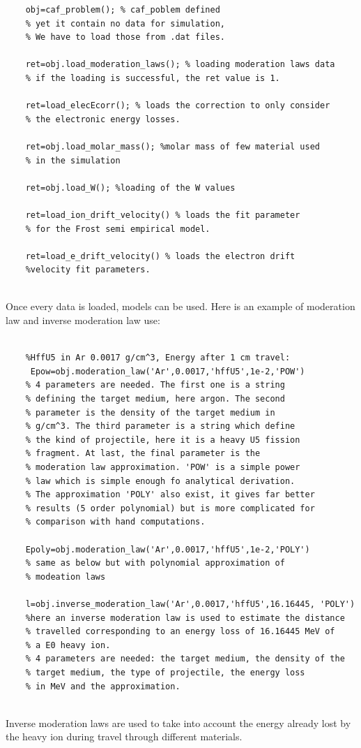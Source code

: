 \documentclass[10pt]{article}
\begin{document}
	\begin{lstlisting}
	obj=caf_problem(); % caf_poblem defined
	% yet it contain no data for simulation,
	% We have to load those from .dat files.
	
	ret=obj.load_moderation_laws(); % loading moderation laws data
	% if the loading is successful, the ret value is 1.
	
	ret=load_elecEcorr(); % loads the correction to only consider
	% the electronic energy losses.
	
	ret=obj.load_molar_mass(); %molar mass of few material used 
	% in the simulation
	
	ret=obj.load_W(); %loading of the W values
	
	ret=load_ion_drift_velocity() % loads the fit parameter
	% for the Frost semi empirical model.
	
	ret=load_e_drift_velocity() % loads the electron drift
	%velocity fit parameters.
		
	\end{lstlisting}
	
	Once every data is loaded, models can be used. Here is an example of moderation law and inverse moderation law use:
	
	\begin{lstlisting}
	
	%HffU5 in Ar 0.0017 g/cm^3, Energy after 1 cm travel:
	 Epow=obj.moderation_law('Ar',0.0017,'hffU5',1e-2,'POW')
	% 4 parameters are needed. The first one is a string
	% defining the target medium, here argon. The second
	% parameter is the density of the target medium in
	% g/cm^3. The third parameter is a string which define
	% the kind of projectile, here it is a heavy U5 fission
	% fragment. At last, the final parameter is the 
	% moderation law approximation. 'POW' is a simple power
	% law which is simple enough fo analytical derivation.
	% The approximation 'POLY' also exist, it gives far better
	% results (5 order polynomial) but is more complicated for
	% comparison with hand computations.
	
	Epoly=obj.moderation_law('Ar',0.0017,'hffU5',1e-2,'POLY')
	% same as below but with polynomial approximation of 
	% modeation laws
	
	l=obj.inverse_moderation_law('Ar',0.0017,'hffU5',16.16445, 'POLY')
	%here an inverse moderation law is used to estimate the distance
	% travelled corresponding to an energy loss of 16.16445 MeV of
	% a E0 heavy ion.
	% 4 parameters are needed: the target medium, the density of the
	% target medium, the type of projectile, the energy loss
	% in MeV and the approximation.
	
	\end{lstlisting}
	Inverse moderation laws are used to take into account the energy already lost by the heavy ion during travel through different materials.
	
\end{document}
